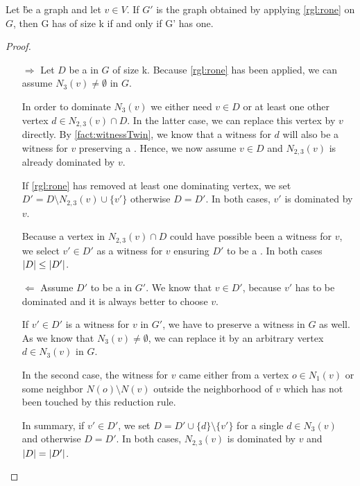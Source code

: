 \begin{lemma}\label{lemma:correctnessone}
    Let \G be a graph and let $v \in V$. If $G'$ is the graph obtained by applying \cref{rgl:rone}   on $G$, then G has \sdom of size k if and only if G' has one.
\end{lemma}
\begin{proof}
    \begin{enumerate}
        \item[$\Rightarrow$] Let $D$ be a \sdom in $G$ of size k. 
        Because \cref{rgl:rone} has been applied, we can assume $N_3(v) \neq \emptyset$ in $G$. 
        
        In order to dominate $N_3(v)$ we either need $v \in D$ or at least one other vertex $d \in N_{2,3}(v) \cap D$. In the latter case, we can replace this vertex by $v$ directly. By \cref{fact:witnessTwin}, we know that a witness for $d$ will also be a witness for $v$ preserving a \sdom. Hence, we now assume $v \in D$ and $N_{2,3}(v)$ is already dominated by $v$.

        If \cref{rgl:rone} has removed at least one dominating vertex, we set $D' = D \setminus N_{2,3}(v) \cup \{v'\}$ otherwise $D = D'$. In both cases, $v'$ is dominated by $v$.

        Because a vertex in $N_{2,3}(v) \cap D$ could have possible been a witness for $v$, we select $v' \in D'$ as a witness for $v$ ensuring $D'$ to be a \sdom. In both cases $\abs{D} \leq \abs{D'}$.

        \item[$\Leftarrow$]  Assume $D'$ to be a \sdom in $G'$. We know that $v \in D'$, because $v'$ has to be dominated and it is always better to choose $v$.

        If $v' \in D'$ is a witness for $v$ in $G'$, we have to preserve a witness in $G$ as well. As we know that $N_3(v) \neq \emptyset$, we can replace it by an arbitrary vertex $d \in N_3(v)$ in $G$. 
        
        In the second case, the witness for $v$ came either from a vertex $o \in N_1(v)$ or some neighbor $N(o) \setminus N(v)$ outside the neighborhood of $v$ which has not been touched by this reduction rule. 
        
        In summary, if $v' \in D'$, we set $D = D' \cup \{d\} \setminus \{v'\}$ for a single $d \in N_3(v)$ and otherwise $D = D'$. In both cases, $N_{2,3}(v)$ is dominated by $v$ and $\abs{D} = \abs{D'}$.
    \end{enumerate}
\end{proof}

